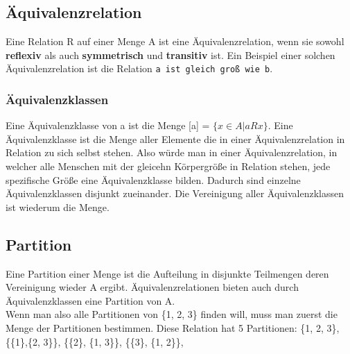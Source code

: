 \documentclass{article}
\begin{document}
	 \subsection{Äquivalenzrelation}
	 Eine Relation R auf einer Menge A ist eine Äquivalenzrelation, wenn sie sowohl \textbf{reflexiv} als auch \textbf{symmetrisch} und \textbf{transitiv} ist. Ein Beispiel einer solchen Äquivalenzrelation ist die Relation \verb|a ist gleich groß wie b|. \\
	 \subsubsection{Äquivalenzklassen}
	 Eine Äquivalenzklasse von a ist die Menge [a] = $\{x\in A|aRx\}$. Eine Äquivalenzklasse ist die Menge aller Elemente die in einer Äquivalenzrelation in Relation zu sich selbst stehen. Also würde man in einer Äquivalenzrelation, in welcher alle Menschen mit der gleicehn Körpergröße in Relation stehen, jede spezifische Größe eine Äquivalenzklasse bilden. Dadurch sind einzelne Äquivalenzklassen disjunkt zueinander. Die Vereinigung aller Äquivalenzklassen ist wiederum die Menge.
	 \subsection{Partition}
	 Eine Partition einer Menge ist die Aufteilung in disjunkte Teilmengen deren Vereinigung wieder A ergibt. Äquivalenzrelationen bieten auch durch Äquivalenzklassen eine Partition von A. \\
	 Wenn man also alle Partitionen von \{1, 2, 3\} finden will, muss man zuerst die Menge der Partitionen bestimmen. Diese Relation hat 5 Partitionen: \{1, 2, 3\}, \{\{1\},\{2, 3\}\}, \{\{2\}, \{1, 3\}\}, \{\{3\}, \{1, 2\}\},
\end{document}
